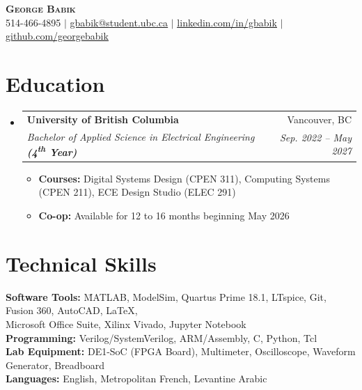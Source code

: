 \documentclass[letterpaper,11pt]{article}
\makeatletter
\newcommand{\resumeItem}[1]{
  \item\small{
    {#1 \vspace{-2pt}}
  }
}
\newcommand{\resumeSubheading}[4]{
  \vspace{-2pt}\item
    \begin{tabular*}{0.97\textwidth}[t]{l@{\extracolsep{\fill}}r}
      \textbf{#1} & #2 \\
      \textit{\small#3} & \textit{\small #4} \\
    \end{tabular*}\vspace{-7pt}
}
\newcommand{\resumeSubHeadingListStart}{\begin{itemize}[leftmargin=0.15in, label={}]}
\newcommand{\resumeSubHeadingListEnd}{\end{itemize}}
\newcommand{\resumeItemListStart}{\begin{itemize}}
\newcommand{\resumeItemListEnd}{\end{itemize}\vspace{-5pt}}
\makeatother
\begin{document}
\begin{center}
    \textbf{\Huge \scshape George Babik} \\ \vspace{1pt}
    \small 514-466-4895 $|$ \href{mailto:gbabik@student.ubc.ca}{\underline{gbabik@student.ubc.ca}} $|$ 
    \href{https://linkedin.com/in/gbabik}{\underline{linkedin.com/in/gbabik}} $|$
    \href{https://github.com/georgebabik}{\underline{github.com/georgebabik}}
\end{center}

\section{Education}
  \resumeSubHeadingListStart
    \resumeSubheading
      {University of British Columbia}{Vancouver, BC}
      {Bachelor of Applied Science in Electrical Engineering \textbf{(4\textsuperscript{th} Year)}}{Sep. 2022 -- May 2027}
      \resumeItemListStart
        \resumeItem{\textbf{Courses:} Digital Systems Design (CPEN 311), Computing Systems (CPEN 211), ECE Design Studio (ELEC 291)}
        \resumeItem{\textbf{Co-op:\hspace{0.3cm}} Available for 12 to 16 months beginning May 2026}
      \resumeItemListEnd
  \resumeSubHeadingListEnd

\section{Technical Skills}
\begin{itemize}[leftmargin=0.15in, label={}]
    \small{\item{
    \begin{tabbing}
        \textbf{Software Tools:} \hspace{0.2cm}\= MATLAB, ModelSim, Quartus Prime 18.1, LTspice, Git, Fusion 360, AutoCAD, LaTeX, \\
        \> Microsoft Office Suite, Xilinx Vivado, Jupyter Notebook \\[3pt]
        
        \textbf{Programming:} \> Verilog/SystemVerilog, ARM/Assembly, C, Python, Tcl \\[3pt]
        
        \textbf{Lab Equipment:} \> DE1-SoC (FPGA Board), Multimeter, Oscilloscope, Waveform Generator, Breadboard \\[3pt]

        \textbf{Languages:} \> English, Metropolitan French, Levantine Arabic
    \end{tabbing}
    }}
\end{itemize}
\end{document}
